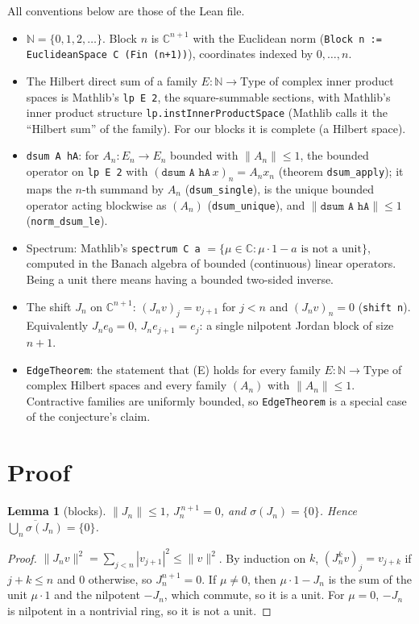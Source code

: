 \documentclass[11pt]{article}
\newtheorem{lemma}[theorem]{Lemma}
\theoremstyle{definition}
\begin{document}
All conventions below are those of the Lean file.
\begin{itemize}
\item $\mathbb{N}=\{0,1,2,\dots\}$. Block $n$ is $\mathbb{C}^{n+1}$ with the Euclidean norm
  (\texttt{Block n := EuclideanSpace C (Fin (n+1))}), coordinates indexed by $0,\dots,n$.
\item The Hilbert direct sum of a family $E:\mathbb{N}\to\text{Type}$ of complex inner product
  spaces is Mathlib's \texttt{lp E 2}, the square-summable sections, with Mathlib's inner product
  structure \texttt{lp.instInnerProductSpace} (Mathlib calls it the ``Hilbert sum'' of the
  family). For our blocks it is complete (a Hilbert space).
\item \texttt{dsum A hA}: for $A_n:E_n\to E_n$ bounded with $\|A_n\|\le 1$, the bounded operator
  on \texttt{lp E 2} with $(\texttt{dsum A hA}\,x)_n = A_n x_n$ (theorem \texttt{dsum\_apply}); it
  maps the $n$-th summand by $A_n$ (\texttt{dsum\_single}), is the unique bounded operator acting
  blockwise as $(A_n)$ (\texttt{dsum\_unique}), and $\|\texttt{dsum A hA}\|\le 1$
  (\texttt{norm\_dsum\_le}).
\item Spectrum: Mathlib's \texttt{spectrum C a} $=\{\mu\in\mathbb{C} : \mu\cdot 1-a \text{ is not a
  unit}\}$, computed in the Banach algebra of bounded (continuous) linear operators. Being a unit
  there means having a bounded two-sided inverse.
\item The shift $J_n$ on $\mathbb{C}^{n+1}$: $(J_nv)_j=v_{j+1}$ for $j<n$ and $(J_nv)_n=0$
  (\texttt{shift n}). Equivalently $J_ne_0=0$, $J_ne_{j+1}=e_j$: a single nilpotent Jordan block of
  size $n+1$.
\item \texttt{EdgeTheorem}: the statement that (E) holds for every family $E:\mathbb{N}\to\text{Type}$
  of complex Hilbert spaces and every family $(A_n)$ with $\|A_n\|\le 1$. Contractive families are
  uniformly bounded, so \texttt{EdgeTheorem} is a special case of the conjecture's claim.
\end{itemize}

\section{Proof}

\begin{lemma}[blocks]\label{lem:blocks}
$\|J_n\|\le 1$, $J_n^{\,n+1}=0$, and $\sigma(J_n)=\{0\}$. Hence
$\overline{\bigcup_n\sigma(J_n)}=\{0\}$.
\end{lemma}
\begin{proof}
$\|J_nv\|^2=\sum_{j<n}|v_{j+1}|^2\le\|v\|^2$. By induction on $k$,
$(J_n^kv)_j=v_{j+k}$ if $j+k\le n$ and $0$ otherwise, so $J_n^{n+1}=0$. If $\mu\ne0$, then
$\mu\cdot1-J_n$ is the sum of the unit $\mu\cdot 1$ and the nilpotent $-J_n$, which commute, so it is
a unit. For $\mu=0$, $-J_n$ is nilpotent in a nontrivial ring, so it is not a unit.
\end{proof}
\end{document}
